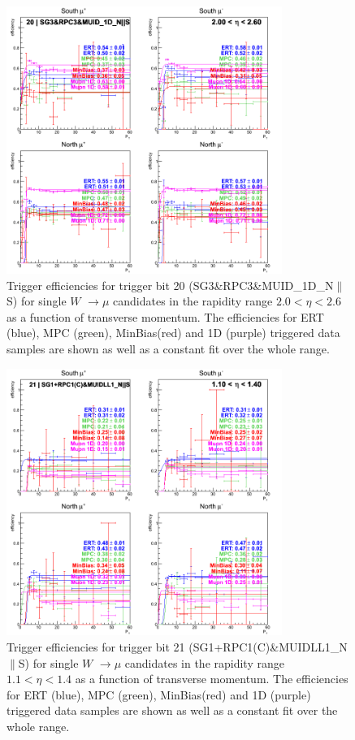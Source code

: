 \begin{figure}[ht]
\begin{center}
\includegraphics[width=0.8\textwidth]{./figures/run13_trigeffipt_eta2_trig20_lin.png}
\caption{\label{fig:run13_trigeffipt_eta2_nper0_trig20_lin} Trigger efficiencies for trigger bit 20 (SG3\&RPC3\&MUID\_1D\_N$\|$S) for single $W$ $\rightarrow \mu$ candidates in the rapidity range $ 2.0 < \eta < 2.6$ as a function of transverse momentum. The efficiencies for ERT (blue), MPC (green), MinBias(red) and 1D (purple) triggered data samples are shown as well as a constant fit over the whole range.}
\end{center}
\end{figure}
\begin{figure}[ht]
\begin{center}
\includegraphics[width=0.8\textwidth]{./figures/run13_trigeffipt_eta0_trig21_lin.png}
\caption{\label{fig:run13_trigeffipt_eta0_nper0_trig21_lin} Trigger efficiencies for trigger bit 21 (SG1+RPC1(C)\&MUIDLL1\_N$\|$S) for single $W$ $\rightarrow \mu$ candidates in the rapidity range $ 1.1 < \eta < 1.4$ as a function of transverse momentum. The efficiencies for ERT (blue), MPC (green), MinBias(red) and 1D (purple) triggered data samples are shown as well as a constant fit over the whole range.}
\end{center}
\end{figure}
